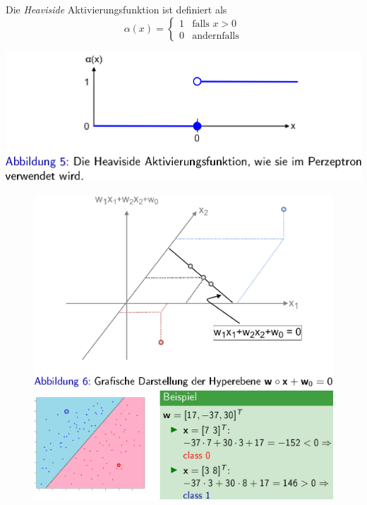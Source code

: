 \documentclass{report}
\begin{document}
  Die \textit{Heaviside} Aktivierungsfunktion ist definiert als	
  \begin{equation*}	
    \alpha(x) = \begin{cases}	
      1 & \text{falls $x > 0$}\\	
      0 & \text{andernfalls}	
    \end{cases}	
  \end{equation*}	
  \begin{center}	
    \includegraphics[scale=.225]{ml04_2}	
  \end{center}	
  
  \begin{figure}[H]	
    \centering	
    \begin{minipage}[b]{0.4\textwidth}	
      \includegraphics[scale=.25]{ml04_4}	
    \end{minipage}	
    \hfill	
    \begin{minipage}[b]{0.4\textwidth}	
      \includegraphics[scale=.25]{ml04_5}	
    \end{minipage}	
  \end{figure}	
  
\end{document}
